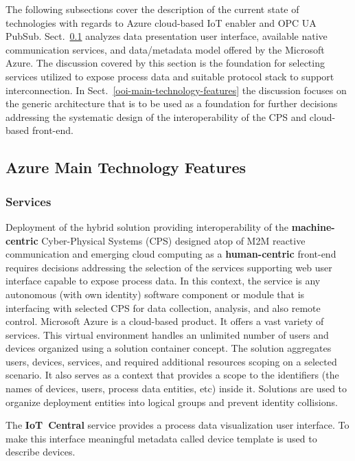 \documentclass{article}
\begin{document}
The following subsections cover the description of the current state of technologies with regards to Azure cloud-based IoT enabler and OPC UA PubSub. Sect.~\ref*{azure-main-technology-features} analyzes data presentation user interface, available native communication services, and data/metadata model offered by the Microsoft Azure. The discussion covered by this section is the foundation for selecting services utilized to expose process data and suitable protocol stack to support interconnection. In Sect.~\ref*{ooi-main-technology-features} the discussion focuses on the generic architecture that is to be used as a foundation for further decisions addressing the systematic design of the interoperability of the CPS and cloud-based front-end.

\subsection{Azure Main Technology Features}\label{azure-main-technology-features}

\subsubsection{Services}\label{services}

Deployment of the hybrid solution providing interoperability of the \textbf{machine-centric} Cyber-Physical Systems (CPS) designed atop of M2M reactive communication and emerging cloud computing as a \textbf{human-centric} front-end requires decisions addressing the selection of the services supporting web user interface capable to expose process data. In this context, the service is any autonomous (with own identity) software component or module that is interfacing with selected CPS for data collection, analysis, and also remote control. Microsoft Azure is a cloud-based product. It offers a vast variety of services. This virtual environment handles an unlimited number of users and devices organized using a solution container concept. The solution aggregates users, devices, services, and required additional resources scoping on a selected scenario. It also serves as a context that provides a scope to the identifiers (the names of devices, users, process data entities, etc) inside it. Solutions are used to organize deployment entities into logical groups and prevent identity collisions.

The \textbf{IoT\ Central} service provides a process data visualization
user interface. To make this interface meaningful metadata called device
template is used to describe devices.
\end{document}
